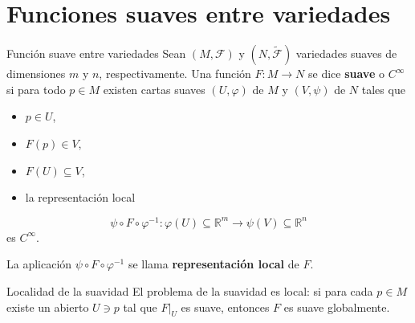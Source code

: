 \section{Funciones suaves entre variedades}
\begin{bookdefinition}{Función suave entre variedades}
Sean $(M,\mathcal{F})$ y $(N,\widetilde{\mathcal{F}})$ variedades suaves de dimensiones $m$ y $n$, respectivamente. Una función $F:M\to N$ se dice \textbf{suave} o \textbf{$C^\infty$} si para todo $p\in M$ existen cartas suaves $(U,\varphi)$ de $M$ y $(V,\psi)$ de $N$ tales que

\begin{itemize}
\item $p\in U$,
\item $F(p)\in V$,
\item $F(U)\subseteq V$,
\item la representación local
\end{itemize}
\[
\psi\circ F\circ\varphi^{-1}:\varphi(U)\subseteq\mathbb{R}^m\to\psi(V)\subseteq\mathbb{R}^n
\]
es $C^\infty$.

La aplicación $\psi\circ F\circ\varphi^{-1}$ se llama \textbf{representación local} de $F$.

\end{bookdefinition}
\label{blk:funcion-suave-entre-variedades}
\begin{bookremark}{Localidad de la suavidad}
El problema de la suavidad es local: si para cada $p\in M$ existe un abierto $U\ni p$ tal que $F|_U$ es suave, entonces $F$ es suave globalmente.

\end{bookremark}

